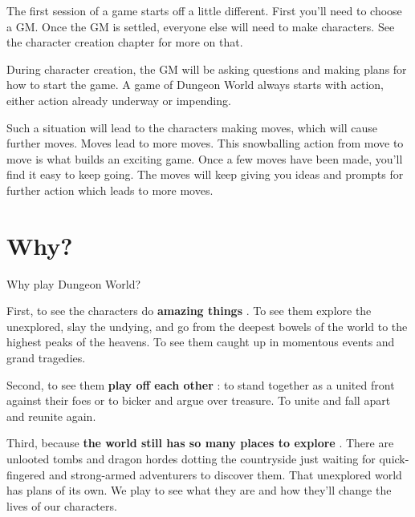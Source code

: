  

The first session of a game starts off a little different. First you'll need to choose a GM. Once the GM is settled, everyone else will need to make characters. See the character creation chapter for more on that.

 

During character creation, the GM will be asking questions and making plans for how to start the game. A game of Dungeon World always starts with action, either action already underway or impending.

  

Such a situation will lead to the characters making moves, which will cause further moves. Moves lead to more moves. This snowballing action from move to move is what builds an exciting game. Once a few moves have been made, you'll find it easy to keep going. The moves will keep giving you ideas and prompts for further action which leads to more moves.

 
\section{Why?}  
 

Why play Dungeon World?

 

First, to see the characters do {\bf amazing things} . To see them explore the unexplored, slay the undying, and go from the deepest bowels of the world to the highest peaks of the heavens. To see them caught up in momentous events and grand tragedies.

 

Second, to see them {\bf play off each other} : to stand together as a united front against their foes or to bicker and argue over treasure. To unite and fall apart and reunite again.

 

Third, because {\bf the world still has so many places to explore} . There are unlooted tombs and dragon hordes dotting the countryside just waiting for quick-fingered and strong-armed adventurers to discover them. That unexplored world has plans of its own. We play to see what they are and how they'll change the lives of our characters.








